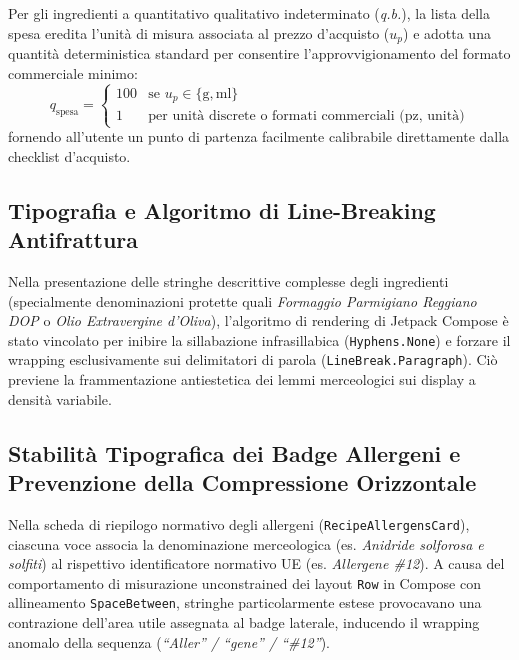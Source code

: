 \documentclass[11pt,a4paper,titlepage]{article}
\begin{document}
Per gli ingredienti a quantitativo qualitativo indeterminato (\textit{q.b.}), la lista della spesa eredita l'unit\`a di misura associata al prezzo d'acquisto ($u_p$) e adotta una quantit\`a deterministica standard per consentire l'approvvigionamento del formato commerciale minimo:
$$
q_{\text{spesa}} = 
\begin{cases}
    100 & \text{se } u_p \in \{\text{g}, \text{ml}\} \\
    1 & \text{per unit\`a discrete o formati commerciali (pz, unit\`a)}
\end{cases}
$$
fornendo all'utente un punto di partenza facilmente calibrabile direttamente dalla checklist d'acquisto.

\subsection{Tipografia e Algoritmo di Line-Breaking Antifrattura}
Nella presentazione delle stringhe descrittive complesse degli ingredienti (specialmente denominazioni protette quali \textit{Formaggio Parmigiano Reggiano DOP} o \textit{Olio Extravergine d'Oliva}), l'algoritmo di rendering di Jetpack Compose \`e stato vincolato per inibire la sillabazione infrasillabica (\texttt{Hyphens.None}) e forzare il wrapping esclusivamente sui delimitatori di parola (\texttt{LineBreak.Paragraph}). Ci\`o previene la frammentazione antiestetica dei lemmi merceologici sui display a densit\`a variabile.

\subsection{Stabilit\`a Tipografica dei Badge Allergeni e Prevenzione della Compressione Orizzontale}
Nella scheda di riepilogo normativo degli allergeni (\texttt{RecipeAllergensCard}), ciascuna voce associa la denominazione merceologica (es. \textit{Anidride solforosa e solfiti}) al rispettivo identificatore normativo UE (es. \textit{Allergene \#12}). A causa del comportamento di misurazione unconstrained dei layout \texttt{Row} in Compose con allineamento \texttt{SpaceBetween}, stringhe particolarmente estese provocavano una contrazione dell'area utile assegnata al badge laterale, inducendo il wrapping anomalo della sequenza (\textit{``Aller'' / ``gene'' / ``\#12''}).
\end{document}
